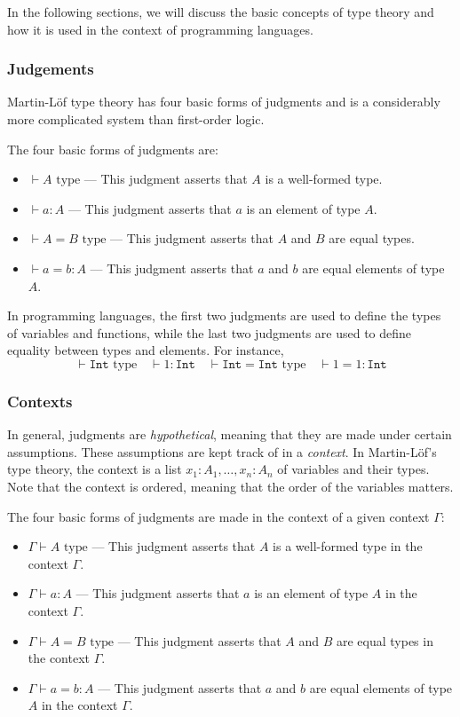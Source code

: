 In the following sections, we will discuss the basic concepts of type theory and how it is used in the context of programming languages.

\subsubsection{Judgements}\label{subsubsec:background:Judgements}

Martin-L\"of type theory has four basic forms of judgments and is a considerably more complicated system than first-order logic.

The four basic forms of judgments are:
\begin{itemize}
    \item $\vdash A \textrm{ type}$ --- This judgment asserts that $A$ is a well-formed type.
    \item $\vdash a : A$ --- This judgment asserts that $a$ is an element of type $A$.
    \item $\vdash A = B \textrm{ type}$ --- This judgment asserts that $A$ and $B$ are equal types.
    \item $\vdash a = b : A$ --- This judgment asserts that $a$ and $b$ are equal elements of type $A$.
\end{itemize}

In programming languages, the first two judgments are used to define the types of variables and functions, while the last two judgments are used to define equality between types and elements.
For instance,
$$
\vdash \texttt{Int} \textrm{ type} \quad \vdash 1 : \texttt{Int} \quad \vdash \texttt{Int} = \texttt{Int} \textrm{ type} \quad \vdash 1 = 1 : \texttt{Int}
$$

\subsubsection{Contexts}\label{subsubsec:background:Contexts}

In general, judgments are \textit{hypothetical}, meaning that they are made under certain assumptions. These assumptions are kept track of in a \textit{context}.
In Martin-L\"of's type theory, the context is a list $x_1 : A_1, \ldots, x_n : A_n$ of variables and their types. Note that the context is ordered, meaning that the order of the variables matters.

The four basic forms of judgments are made in the context of a given context $\Gamma$:
\begin{itemize}
    \item $\Gamma \vdash A \textrm{ type}$ --- This judgment asserts that $A$ is a well-formed type in the context $\Gamma$.
    \item $\Gamma \vdash a : A$ --- This judgment asserts that $a$ is an element of type $A$ in the context $\Gamma$.
    \item $\Gamma \vdash A = B \textrm{ type}$ --- This judgment asserts that $A$ and $B$ are equal types in the context $\Gamma$.
    \item $\Gamma \vdash a = b : A$ --- This judgment asserts that $a$ and $b$ are equal elements of type $A$ in the context $\Gamma$.
\end{itemize}

